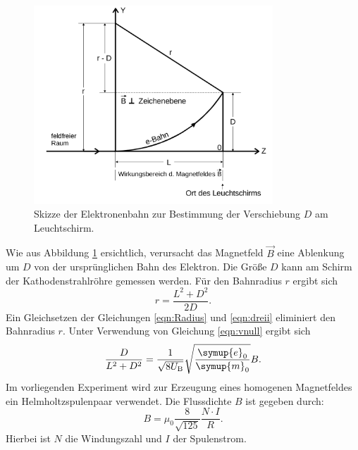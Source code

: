 \begin{figure}
  \centering
  \includegraphics[width=0.8\textwidth]{Messdaten/ablenkungbfeld.png}
  \caption{Skizze der Elektronenbahn zur Bestimmung der Verschiebung $D$ am Leuchtschirm.}
  \label{fig:D}
\end{figure}
Wie aus Abbildung \ref{fig:D} ersichtlich, verursacht das Magnetfeld $\vec{B}$ eine Ablenkung um $D$ von der ursprünglichen Bahn des Elektron.
Die Größe $D$ kann am Schirm der Kathodenstrahlröhre gemessen werden.
Für den Bahnradius $r$ ergibt sich
\begin{equation}
  \label{eqn:dreii}
	r=\frac{L^2+D^2}{2D} \mathrm{.}
\end{equation}
Ein Gleichsetzen der Gleichungen \eqref{eqn:Radius} und \eqref{eqn:dreii} eliminiert den Bahnradius $r$. Unter Verwendung von Gleichung \eqref{eqn:vnull} ergibt sich
\begin{equation}
  \label{eqn:bfeld1}
  \frac{D}{L^2+D^2}=\frac{1}{\sqrt{8U_\mathrm{B}}}\sqrt{\frac{\symup{e}_0}{\symup{m}_0}}B \text{.}
\end{equation}
Im vorliegenden Experiment wird zur Erzeugung eines homogenen Magnetfeldes ein Helmholtzspulenpaar verwendet.
Die Flussdichte $B$ ist gegeben durch:
\begin{equation}
  B=\mu_0\frac{8}{\sqrt{125}}\frac{N\cdot I}{R} \text{.}
\end{equation}
Hierbei ist $N$ die Windungszahl und $I$ der Spulenstrom.
